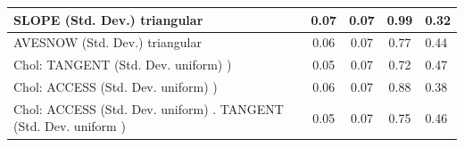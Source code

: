 \begin{table}
\begin{center}
\begin{tabular}{|l|l|c|c|c|l|}
			\hline
			SLOPE (Std. Dev.) triangular &  & 0.07 & 0.07 & 0.99 & 0.32 \\
			\hline
			AVESNOW (Std. Dev.) triangular &  & 0.06 & 0.07 & 0.77 & 0.44 \\
			\hline
			 Chol: TANGENT (Std. Dev. uniform) ) &  & 0.05 & 0.07 & 0.72 & 0.47 \\
			\hline
			 Chol: ACCESS (Std. Dev. uniform) ) &  & 0.06 & 0.07 & 0.88 & 0.38 \\
			\hline
			 Chol: ACCESS (Std. Dev. uniform) . TANGENT (Std. Dev.   uniform ) &  & 0.05 & 0.07 & 0.75 & 0.46 \\
			\hline
		\end{tabular}
	\end{center}
\end{table}